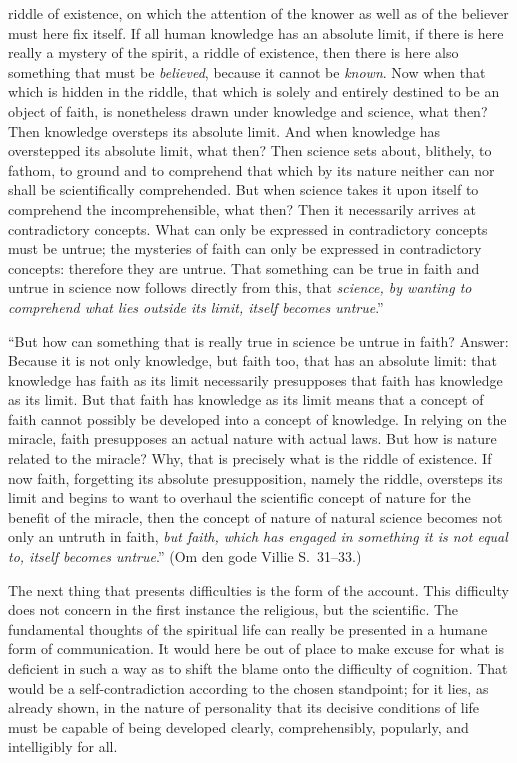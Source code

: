 \documentclass[12pt]{book}
\newcommand{\opage}[1]{\marginnote{\footnotesize\textit{[#1]}}}
\begin{document}
riddle of existence, on which the attention of the knower as well as of
the believer must here fix itself. If all human knowledge has an
absolute limit, if there is here really a mystery of the spirit, a
riddle of existence, then there is here also something that must be
\emph{believed}, because it cannot be \emph{known}. Now when that which
is hidden in the riddle, that which is solely and entirely destined to be
an object of faith, is nonetheless drawn under knowledge and science,
what then? Then knowledge oversteps its absolute limit. And when
knowledge has overstepped its absolute limit, what then? Then science
sets about, blithely, to fathom, to ground and to comprehend that which
by its nature neither can nor shall be scientifically comprehended. But
when science takes it upon itself to comprehend the incomprehensible,
what then? Then it necessarily arrives at contradictory concepts. What
can only be expressed in contradictory concepts must be untrue; the
mysteries of faith can only be expressed in contradictory concepts:
therefore they are untrue. That something can be true in faith and
untrue in science now follows directly from this, that \emph{science,
by wanting to comprehend what lies outside its limit, itself becomes
untrue}.''

``But how can something that is really true in science be untrue in
faith? Answer: Because it is not only knowledge, but faith too, that
has an absolute limit: that knowledge has faith as its limit
necessarily presupposes that faith has knowledge as its limit. But that
faith has knowledge as its limit means that a concept of faith cannot
possibly be developed into a concept of knowledge. In relying on the
miracle, faith presupposes an actual nature with actual laws. But how is
nature related to the miracle? Why, that is precisely what
\opage{228}\setcounter{footnote}{0}%
is the riddle of existence. If now faith, forgetting its absolute
presupposition, namely the riddle, oversteps its limit and begins to
want to overhaul the scientific concept of nature for the benefit of the
miracle, then the concept of nature of natural science becomes not only
an untruth in faith, \emph{but faith, which has engaged in something it
is not equal to, itself becomes untrue}.'' (Om den gode Villie
S.~31--33.)

The next thing that presents difficulties is the form of the account.
This difficulty does not concern in the first instance the religious,
but the scientific. The fundamental thoughts of the spiritual life can
really be presented in a humane form of communication. It would here be
out of place to make excuse for what is deficient in such a way as to
shift the blame onto the difficulty of cognition. That would be a
self-contradiction according to the chosen standpoint; for it lies, as
already shown, in the nature of personality that its decisive
conditions of life must be capable of being developed clearly,
comprehensibly, popularly, and intelligibly for all.
\end{document}
